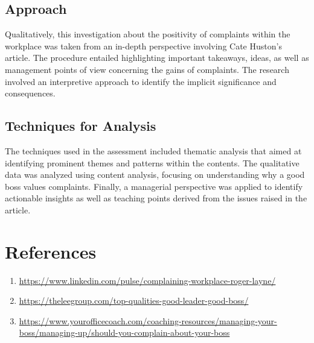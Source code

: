 \documentclass[a4paper,12pt]{report}
\begin{document}
\section{Approach}
\begin{enumerate}
Qualitatively, this investigation about the positivity of complaints within the workplace was taken from an in-depth perspective involving Cate Huston’s article. The procedure entailed highlighting important takeaways, ideas, as well as management points of view concerning the gains of complaints. The research involved an interpretive approach to identify the implicit significance and consequences.  
\end{enumerate}


\section{Techniques for Analysis}
\begin{enumerate}
The techniques used in the assessment included thematic analysis that aimed at identifying prominent themes and patterns within the contents. The qualitative data was analyzed using content analysis, focusing on understanding why a good boss values complaints. Finally, a managerial perspective was applied to identify actionable insights as well as teaching points derived from the issues raised in the article.
\end{enumerate}



\chapter{References}
\begin{enumerate}
  \item \url{https://www.linkedin.com/pulse/complaining-workplace-roger-layne/}
   \item \url{https://theleegroup.com/top-qualities-good-leader-good-boss/}
     \item \url{https://www.yourofficecoach.com/coaching-resources/managing-your-boss/managing-up/should-you-complain-about-your-boss}
\end{enumerate}
\end{document}
